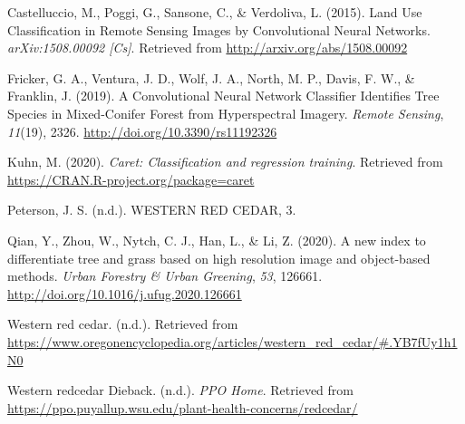 \documentclass[12pt,twoside]{reedthesis}
\begin{document}
\setlength{\parindent}{-0.20in}
\setlength{\leftskip}{0.20in}
\setlength{\parskip}{8pt}

\hypertarget{refs}{}
\leavevmode\hypertarget{ref-castelluccio_land_2015}{}%
Castelluccio, M., Poggi, G., Sansone, C., \& Verdoliva, L. (2015). Land Use Classification in Remote Sensing Images by Convolutional Neural Networks. \emph{arXiv:1508.00092 {[}Cs{]}}. Retrieved from \url{http://arxiv.org/abs/1508.00092}

\leavevmode\hypertarget{ref-fricker_convolutional_2019}{}%
Fricker, G. A., Ventura, J. D., Wolf, J. A., North, M. P., Davis, F. W., \& Franklin, J. (2019). A Convolutional Neural Network Classifier Identifies Tree Species in Mixed-Conifer Forest from Hyperspectral Imagery. \emph{Remote Sensing}, \emph{11}(19), 2326. \url{http://doi.org/10.3390/rs11192326}

\leavevmode\hypertarget{ref-caret}{}%
Kuhn, M. (2020). \emph{Caret: Classification and regression training}. Retrieved from \url{https://CRAN.R-project.org/package=caret}

\leavevmode\hypertarget{ref-peterson_western_nodate}{}%
Peterson, J. S. (n.d.). WESTERN RED CEDAR, 3.

\leavevmode\hypertarget{ref-qian_new_2020}{}%
Qian, Y., Zhou, W., Nytch, C. J., Han, L., \& Li, Z. (2020). A new index to differentiate tree and grass based on high resolution image and object-based methods. \emph{Urban Forestry \& Urban Greening}, \emph{53}, 126661. \url{http://doi.org/10.1016/j.ufug.2020.126661}

\leavevmode\hypertarget{ref-noauthor_western_nodate-1}{}%
Western red cedar. (n.d.). Retrieved from \url{https://www.oregonencyclopedia.org/articles/western_red_cedar/\#.YB7fUy1h1N0}

\leavevmode\hypertarget{ref-noauthor_western_nodate}{}%
Western redcedar Dieback. (n.d.). \emph{PPO Home}. Retrieved from \url{https://ppo.puyallup.wsu.edu/plant-health-concerns/redcedar/}


\end{document}

